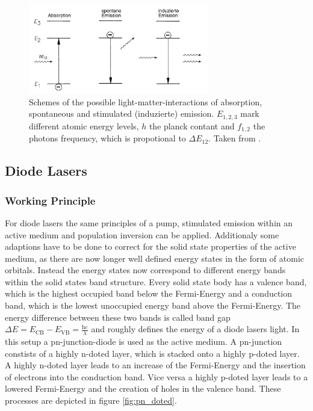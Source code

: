         \begin{figure}[h]
            \centering
            \includegraphics[width = 0.7\textwidth]{pictures/prozesse.jpg}
            \caption{Schemes of the possible light-matter-interactions of absorption, spontaneous and stimulated (induzierte) emission. $E_{1,2,3}$ mark different atomic energy levels, $h$ the planck contant and $f_{1,2}$ the photons frequency, which is propotional to $\Delta E_{12}$. Taken from \cite{eichler_laser_2015}.}
            \label{fig:prozesse}
        \end{figure}
        
        \FloatBarrier


    \subsection{Diode Lasers}
        \subsubsection{Working Principle}
            For diode lasers the same principles of a pump, stimulated emission within an active medium and population inversion can be applied. Additionaly some adaptions have to be done to correct for the solid 
            state properties of the active medium, as there are now longer well defined energy states in the form of atomic orbitals. Instead the energy states now correspond to different energy bands within the solid 
            states band structure. 
            Every solid state body has a valence band, which is the highest occupied band below the Fermi-Energy and a conduction band, which is the lowest unoccupied energy band above the Fermi-Energy. The energy
            difference between these two bands is called band gap $\Delta E = E_{\text{CB}} - E_{\text{VB}} = \frac{\text{hc}}{\lambda}$ and roughly defines the energy of a diode lasers light. 
            In this setup a pn-junction-diode is used as the active medium. A pn-junction constists of a highly n-doted layer, which is stacked onto a highly p-doted layer. A highly n-doted layer leads to an 
            increase of the Fermi-Energy and the insertion of electrons into the conduction band. Vice versa a highly p-doted layer leads to a lowered Fermi-Energy and the creation of holes in the valence band. 
            These processes are depicted in figure \ref{fig:pn_doted}.  

